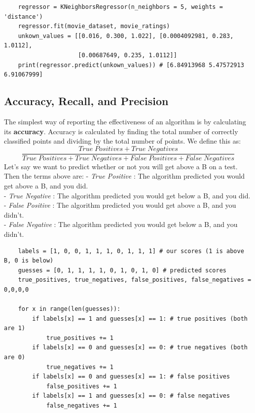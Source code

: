 \documentclass[11pt, a4paper]{article}
\begin{document}
\begin{spacing}{1.1}
\begin{lstlisting}
	regressor = KNeighborsRegressor(n_neighbors = 5, weights = 'distance')
	regressor.fit(movie_dataset, movie_ratings)
	unkown_values = [[0.016, 0.300, 1.022], [0.0004092981, 0.283, 1.0112], 
	                 [0.00687649, 0.235, 1.0112]]
	print(regressor.predict(unkown_values)) # [6.84913968 5.47572913 6.91067999] \end{lstlisting}\vspace*{1mm}
	
	\subsection{Accuracy, Recall, and Precision}
	The simplest way of reporting the effectiveness of an algorithm is by calculating its \textbf{accuracy}. Accuracy is calculated by finding the total number of correctly classified points and dividing by the total number of points. We define this as: $$  \frac{True\; Positives + True\; Negatives}{True\; Positives + True\; Negatives + False\; Positives + False\; Negatives}$$
	Let's say we want to predict whether or not you will get above a B on a test. Then the terms above are:
	\hspace*{3mm} - \textit{True Positive} : The algorithm predicted you would get above a B, and you did. \\
	\hspace*{3mm} - \textit{True Negative} : The algorithm predicted you would get below a B, and you did. \\
	\hspace*{3mm} - \textit{False Positive} : The algorithm predicted you would get above a B, and you didn’t. \\
	\hspace*{3mm} - \textit{False Negative} : The algorithm predicted you would get below a B, and you didn’t. 
	\begin{lstlisting}
	labels = [1, 0, 0, 1, 1, 1, 0, 1, 1, 1] # our scores (1 is above B, 0 is below)
	guesses = [0, 1, 1, 1, 1, 0, 1, 0, 1, 0] # predicted scores
	true_positives, true_negatives, false_positives, false_negatives = 0,0,0,0
	
	for x in range(len(guesses)):
		if labels[x] == 1 and guesses[x] == 1: # true positives (both are 1)
			true_positives += 1
		if labels[x] == 0 and guesses[x] == 0: # true negatives (both are 0)
			true_negatives += 1
		if labels[x] == 0 and guesses[x] == 1: # false positives 
			false_positives += 1
		if labels[x] == 1 and guesses[x] == 0: # false negatives
			false_negatives += 1 \end{lstlisting} \newpage


\end{spacing}
\end{document}
